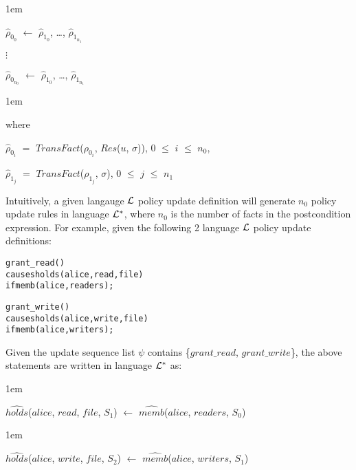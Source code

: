 \documentclass[11pt]{report}
\newenvironment{vverbatim}
{
  \begin{alltt}
}
{
    \vspace{-\baselineskip}
  \end{alltt}
}
\newenvironment{vquote}
{
  \begin{list}{}{\leftmargin 1em}\item[]
}
{
  \end{list}
}
\begin{document}
          \begin{vquote}
            $\hat{\rho}_{0_{0}}$ $\leftarrow$
              $\hat{\rho}_{1_{0}}$, \ldots, $\hat{\rho}_{1_{n_1}}$

            $\vdots$

            $\hat{\rho}_{0_{n_0}}$ $\leftarrow$
              $\hat{\rho}_{1_{0}}$, \ldots, $\hat{\rho}_{1_{n_1}}$
          \end{vquote}

          \begin{vquote}
            where

            \hspace{1em}
            $\hat{\rho}_{0_i}$ $=$
              $TransFact$($\rho_{0_i}$, $Res$($u$, $\sigma$)),
              $0$ $\leq$ $i$ $\leq$ $n_0$,

            \hspace{1em}
            $\hat{\rho}_{1_j}$ $=$
              $TransFact$($\rho_{1_j}$, $\sigma$),
              $0$ $\leq$ $j$ $\leq$ $n_1$
          \end{vquote}

          Intuitively, a given langauge ${\cal L}$ policy update definition
          will generate $n_0$ policy update rules in language ${\cal L^{*}}$,
          where $n_0$ is the number of facts in the postcondition expression.
          For example, given the following 2 language ${\cal L}$ policy
          update definitions:

          \begin{vverbatim}
  grant\_read()
    causes holds(alice, read, file)
    if memb(alice, readers);

  grant\_write()
    causes holds(alice, write, file)
    if memb(alice, writers);
          \end{vverbatim}

          Given the update sequence list $\psi$ contains
          \{$grant\_read$, $grant\_write$\}, the above statements are written
          in language ${\cal L}^{*}$ as:

          \begin{vquote}
            $\hat{holds}$($alice$, $read$, $file$, $S_{1}$) $\leftarrow$
            $\hat{memb}$($alice$, $readers$, $S_{0}$)
          \end{vquote}

          \begin{vquote}
            $\hat{holds}$($alice$, $write$, $file$, $S_{2}$) $\leftarrow$
            $\hat{memb}$($alice$, $writers$, $S_{1}$)
          \end{vquote}
\end{document}
